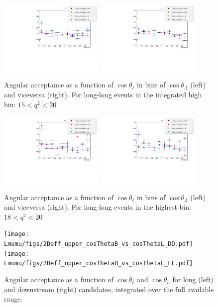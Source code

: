 \begin{figure}[h!]
\includegraphics[width=0.45\textwidth]{Lmumu/figs/effs/LLeff_highq2.pdf}
\includegraphics[width=0.45\textwidth]{Lmumu/figs/effs/LLBeff_highq2.pdf}
\caption{Angular acceptance as a function of $\cos\theta_\ell$ in bins of $\cos\theta_\Lambda$ (left) and viceversa (right). For long-long events in the integrated high \qsq bin: $15 < q^2 < 20$}
\end{figure}




\begin{figure}[h!]
\includegraphics[width=0.45\textwidth]{Lmumu/figs/effs/LLeff_highestq2.pdf}
\includegraphics[width=0.45\textwidth]{Lmumu/figs/effs/LLBeff_highestq2.pdf}
\caption{Angular acceptance as a function of $\cos\theta_\ell$ in bins of $\cos\theta_\Lambda$ (left) and viceversa (right). For long-long events in the highest \qsq bin: $18 < q^2 < 20$}
\end{figure}



\begin{figure}[h!]
\texttt{[image: Lmumu/figs/2Deff\_upper\_cosThetaB\_vs\_cosThetaL\_DD.pdf]}
\texttt{[image: Lmumu/figs/2Deff\_upper\_cosThetaB\_vs\_cosThetaL\_LL.pdf]}
\caption{Angular acceptance as a function of $\cos\theta_\ell$ and $\cos\theta_h$ for long (left) and
downstream (right) candidates, integrated over the full available \qsq range.}
\label{fig:2DcosThetaLandBeff}
\end{figure}

\clearpage
